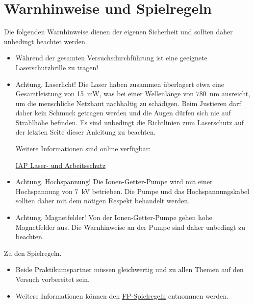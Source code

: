 \documentclass[
class=book,
accentcolor=1b,
custommargins=geometry,
fontsize=11pt,
thesis={type=Versuchsanleitung},
ruledheaders=all,
headline=false,
instbox=false,
marginpar=false,
title=small,
ignore-missing-data=true,
twoside=false,
logofile=apqdesign/tuda_logo.pdf,
pdfa=false %
]{apqpub}
\begin{document}
	\tableofcontents
	
	\mainmatter
	\setcounter{page}{1}
	
	
	
	
\chapter*{Warnhinweise und Spielregeln}
Die folgenden Warnhinweise dienen der eigenen Sicherheit und sollten daher unbedingt beachtet werden.
\begin{itemize}
	\item Während der gesamten Versuchsdurchführung ist eine geeignete Laserschutzbrille zu tragen!
	
	\item Achtung, Laserlicht! Die Laser haben zusammen überlagert etwa eine Gesamtleistung von \qty{15}{\milli\watt}, was bei
	einer Wellenlänge von \qty{780}{\nano\metre} ausreicht, um die menschliche Netzhaut nachhaltig zu schädigen. Beim Justieren
	darf daher kein Schmuck getragen werden und die Augen dürfen sich nie auf Strahlhöhe befinden.
	Es sind unbedingt die Richtlinien zum Laserschutz auf der letzten Seite dieser Anleitung zu beachten.
	
	Weitere Informationen sind online verfügbar:
	
	\href{https://www.iap.tu-darmstadt.de/infrastruktur_iap/laser_und_arbeitsschutz_iap/index.de.jsp}{IAP Laser- und Arbeitsschutz}
	
	\item Achtung, Hochspannung! Die Ionen-Getter-Pumpe wird mit einer Hochspannung von \qty{7}{\kilo\volt} betrieben. Die
	Pumpe und das Hochspannungskabel sollten daher mit dem nötigen Respekt behandelt werden.
	
	\item Achtung, Magnetfelder! Von der Ionen-Getter-Pumpe gehen hohe Magnetfelder aus. Die Warnhinweise an
	der Pumpe sind daher unbedingt zu beachten.
\end{itemize}

Zu den Spielregeln.
\begin{itemize}
	\item Beide Praktikumspartner müssen gleichwertig und zu allen Themen auf den Versuch vorbereitet sein.
	
	\item Weitere Informationen können den \href{https://www.physik.tu-darmstadt.de/media/ipkm/studium_ipkm/f_praktikum/fprakt/fpspielregeln.pdf}{FP-Spielregeln} entnommen werden.
\end{itemize}
\end{document}
